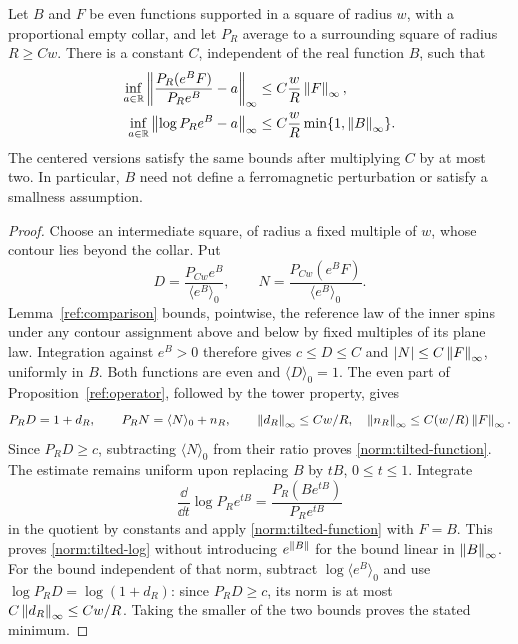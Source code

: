 \begin{lemma}\label{norm:attenuation}
Let $B$ and $F$ be even functions supported in a square of radius $w$,
with a proportional empty collar, and let $P_R$ average to a surrounding
square of radius $R\ge Cw$.  There is a constant $C$, independent of the
real function $B$, such that
\begin{align}
 \inf_{a\in\mathbb R}\left\lVert\frac{P_R(e^BF)}{P_R e^B}-a\right\rVert_\infty
       &\le C\frac wR\left\lVert F\right\rVert_\infty,\label{norm:tilted-function}\\
 \inf_{a\in\mathbb R}\left\lVert\log P_R e^B-a\right\rVert_\infty
       &\le C\frac wR\min\{1,\left\lVert B\right\rVert_\infty\}.
                                      \label{norm:tilted-log}
\end{align}
The centered versions satisfy the same bounds after multiplying $C$ by
at most two.  In particular, $B$ need not define a ferromagnetic
perturbation or satisfy a smallness assumption.
\end{lemma}
\begin{proof}
Choose an intermediate square, of radius a fixed multiple of $w$, whose
contour lies beyond the collar.  Put
\[
 D=\frac{P_{Cw}e^B}{\langle e^B\rangle_0},\qquad
 N=\frac{P_{Cw}(e^BF)}{\langle e^B\rangle_0}.
\]
Lemma~\ref{ref:comparison} bounds, pointwise, the reference law of
the inner spins under any contour assignment above and below by fixed
multiples of its plane law.  Integration against $e^B>0$ therefore gives
$c\le D\le C$ and $|N|\le C\left\lVert F\right\rVert_\infty$, uniformly in $B$.
Both functions are even and $\langle D\rangle_0=1$.
The even part of Proposition~\ref{ref:operator}, followed by the tower
property, gives
\[
 P_RD=1+d_R,\qquad P_RN=\langle N\rangle_0+n_R,
 \qquad \left\lVert d_R\right\rVert_\infty\le Cw/R,
 \quad \left\lVert n_R\right\rVert_\infty\le C(w/R)\left\lVert F\right\rVert_\infty.
\]
Since $P_RD\ge c$, subtracting $\langle N\rangle_0$ from their ratio
proves \eqref{norm:tilted-function}.  The estimate remains uniform upon
replacing $B$ by $tB$, $0\le t\le1$.  Integrate
\[
 \frac{\dd}{\dd t}\log P_Re^{tB}
       =\frac{P_R(Be^{tB})}{P_Re^{tB}}
\]
in the quotient by constants and apply \eqref{norm:tilted-function}
with $F=B$.  This proves \eqref{norm:tilted-log} without introducing
$e^{\left\lVert B\right\rVert}$ for the bound linear in $\left\lVert B\right\rVert_\infty$.
For the bound independent of that norm, subtract
$\log\langle e^B\rangle_0$ and use
$\log P_RD=\log(1+d_R)$: since $P_RD\ge c$, its norm is at most
$C\left\lVert d_R\right\rVert_\infty\le Cw/R$.  Taking the smaller of the two bounds
proves the stated minimum.
\end{proof}

